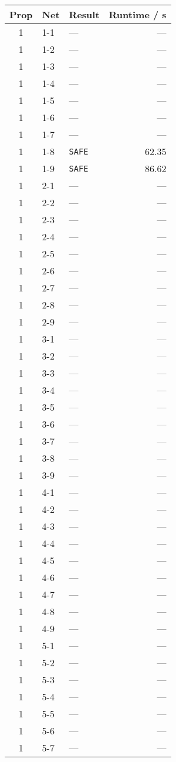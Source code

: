 \documentclass{article}%
\begin{document}
%
\begin{longtable}{@{}cll|r@{}}%
\toprule%
\textbf{Prop}&\textbf{Net}&\textbf{Result}&\textbf{Runtime / s}\\%
\midrule%
\endhead%
1&1{-}1&—&—\\%
1&1{-}2&—&—\\%
1&1{-}3&—&—\\%
1&1{-}4&—&—\\%
1&1{-}5&—&—\\%
1&1{-}6&—&—\\%
1&1{-}7&—&—\\%
1&1{-}8&\verb|SAFE|&62.35\\%
1&1{-}9&\verb|SAFE|&86.62\\%
1&2{-}1&—&—\\%
1&2{-}2&—&—\\%
1&2{-}3&—&—\\%
1&2{-}4&—&—\\%
1&2{-}5&—&—\\%
1&2{-}6&—&—\\%
1&2{-}7&—&—\\%
1&2{-}8&—&—\\%
1&2{-}9&—&—\\%
1&3{-}1&—&—\\%
1&3{-}2&—&—\\%
1&3{-}3&—&—\\%
1&3{-}4&—&—\\%
1&3{-}5&—&—\\%
1&3{-}6&—&—\\%
1&3{-}7&—&—\\%
1&3{-}8&—&—\\%
1&3{-}9&—&—\\%
1&4{-}1&—&—\\%
1&4{-}2&—&—\\%
1&4{-}3&—&—\\%
1&4{-}4&—&—\\%
1&4{-}5&—&—\\%
1&4{-}6&—&—\\%
1&4{-}7&—&—\\%
1&4{-}8&—&—\\%
1&4{-}9&—&—\\%
1&5{-}1&—&—\\%
1&5{-}2&—&—\\%
1&5{-}3&—&—\\%
1&5{-}4&—&—\\%
1&5{-}5&—&—\\%
1&5{-}6&—&—\\%
1&5{-}7&—&—\\%

\end{longtable}
\end{document}
